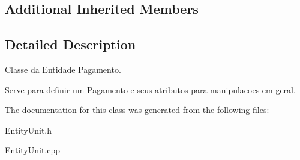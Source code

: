 \subsection*{Additional Inherited Members}


\subsection{Detailed Description}
Classe da Entidade Pagamento. 

Serve para definir um Pagamento e seus atributos para manipulacoes em geral. 

The documentation for this class was generated from the following files\-:\begin{DoxyCompactItemize}
\item 
Entity\-Unit.\-h\item 
Entity\-Unit.\-cpp\end{DoxyCompactItemize}
